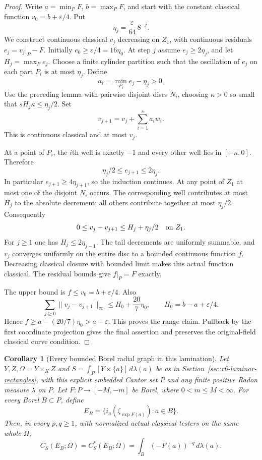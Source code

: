 \documentclass[11pt,a4paper]{article}
\numberwithin{equation}{section}
\newtheorem{corollary}[theorem]{Corollary}
\theoremstyle{definition}
\theoremstyle{remark}
\begin{document}
\begin{proof}
Write $a=\min_PF$, $b=\max_PF$, and start with the constant classical
function $v_0=b+\varepsilon/4$. Put
\[
                    \eta_j=\frac{\varepsilon}{64}\,8^{-j}.
\]
We construct continuous classical $v_j$ decreasing on $Z_1$, with
continuous residuals $e_j=v_j|_P-F$. Initially
$e_0\ge\varepsilon/4=16\eta_0$.
At step $j$ assume $e_j\ge2\eta_j$, and let
$H_j=\max_Pe_j$. Choose a finite cylinder partition such that the
oscillation of $e_j$ on each part $P_i$ is at most $\eta_j$.
Define
\[
                    a_i=\min_{P_i}e_j-\eta_j>0.
\]
Use the preceding lemma with pairwise disjoint discs $N_i$, choosing
$\kappa>0$ so small that $sH_j\kappa\le\eta_j/2$. Set
\[
                       v_{j+1}=v_j+\sum_{i=1}^s a_iw_i.
\]
This is continuous classical and at most $v_j$.

At a point of $P_i$, the $i$th well is exactly $-1$ and every other
well lies in $[-\kappa,0]$. Therefore
\[
                    \eta_j/2\le e_{j+1}\le2\eta_j.
\]
In particular $e_{j+1}\ge4\eta_{j+1}$, so the induction continues.
At any point of $Z_1$ at most one of the disjoint $N_i$ occurs.
The corresponding well contributes at most $H_j$ to the absolute
decrement; all others contribute together at most $\eta_j/2$.
Consequently
\[
       0\le v_j-v_{j+1}\le H_j+\eta_j/2\quad\hbox{on }Z_1.
\]
For $j\ge1$ one has $H_j\le2\eta_{j-1}$. The tail decrements are
uniformly summable, and $v_j$ converges uniformly on the entire disc
to a bounded continuous function $f$. Decreasing classical closure
with bounded limit makes this actual function classical. The residual
bounds give $f|_P=F$ exactly.

The upper bound is $f\le v_0=b+\varepsilon/4$. Also
\[
 \sum_{j\ge0}\|v_j-v_{j+1}\|_\infty
 \le H_0+\frac{20}{7}\eta_0,
 \qquad H_0=b-a+\varepsilon/4.
\]
Hence $f\ge a-(20/7)\eta_0>a-\varepsilon$. This proves the range
claim. Pullback by the first coordinate projection gives the final
assertion and preserves the original-field classical curve condition.
\end{proof}

\begin{corollary}[Every bounded Borel radial graph in this lamination]
\label{cor:r6-borel-cantor-gauss-graphs}
Let $Y,Z,\Omega=Y\times_KZ$ and
$S=\int_P[Y\times\{a\}]\,d\lambda(a)$ be as in
Section~\ref{sec:r6-laminar-rectangles}, with this explicit embedded
Cantor set $P$ and any finite positive Radon measure $\lambda$ on $P$.
Let $F:P\to[-M,-m]$ be Borel, where $0<m\le M<\infty$.
For every Borel $B\subset P$, define
\[
 E_B=\{i_a(\zeta_{\exp F(a)}):a\in B\}.
\]
Then, in every $p,q\ge1$, with normalized actual classical testers
on the same whole $\Omega$,
\[
              C_S(E_B;\Omega)=C_S^*(E_B;\Omega)
                     =\int_B(-F(a))^{-q}\,d\lambda(a).
\]
\end{corollary}
\end{document}

